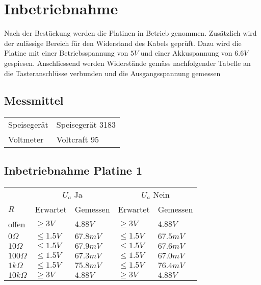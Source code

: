 
\section{Inbetriebnahme}
Nach der Bestückung werden die Platinen in Betrieb genommen. Zusätzlich wird 
der zulässige Bereich für den Widerstand des Kabels geprüft. Dazu wird die 
Platine mit einer Betriebsspannung von $5 V$ und einer Akkuspannung von $6.6 V$ 
gespiesen. Anschliessend werden Widerstände gemäss nachfolgender Tabelle an die 
Tasteranschlüsse verbunden und die Ausgangsspannung gemessen

\subsection{Messmittel}
\begin{tabular}{@{}ll}
Speisegerät & Speisegerät 3183 \\
Voltmeter   & Voltcraft 95 \\
\end{tabular}

\subsection{Inbetriebnahme Platine 1}
\begin{tabular}{@{}lllll}
                & \multicolumn{2}{c}{$U_a$ Ja}  & \multicolumn{2}{c}{$U_a$ Nein} \\
  $R$           & Erwartet  & Gemessen  & Erwartet  & Gemessen  \\
  offen         & $\geq3V$  & $4.88V$   & $\geq3V$  & $4.88V$   \\
  $0 \Omega$    & $\leq1.5V$& $67.8mV$  & $\leq1.5V$& $67.5mV$  \\
  $10 \Omega$   & $\leq1.5V$& $67.9mV$  & $\leq1.5V$& $67.6mV$  \\
  $100 \Omega$  & $\leq1.5V$& $67.3mV$  & $\leq1.5V$& $67.0mV$  \\
  $1 k\Omega$   & $\leq1.5V$& $75.8mV$  & $\leq1.5V$& $76.4mV$  \\
  $10 k\Omega$  & $\geq3V$  & $4.88V$   & $\geq3V$  & $4.88V$   \\
\end{tabular}

